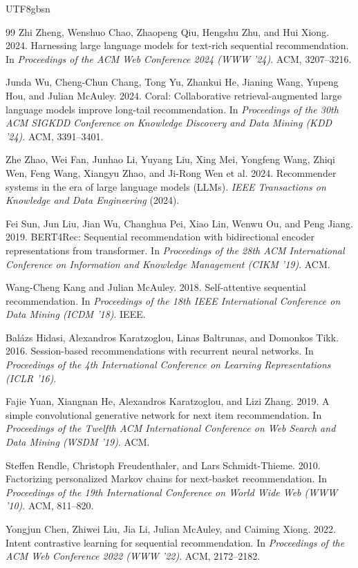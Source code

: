 \documentclass{article}
\begin{document}
\begin{CJK*}{UTF8}{gbsn}
\begin{thebibliography}{99}
Zhi Zheng, Wenshuo Chao, Zhaopeng Qiu, Hengshu Zhu, and Hui Xiong. 2024.
Harnessing large language models for text-rich sequential recommendation.
In \textit{Proceedings of the ACM Web Conference 2024 (WWW '24)}. ACM, 3207--3216.

Junda Wu, Cheng-Chun Chang, Tong Yu, Zhankui He, Jianing Wang, Yupeng Hou, and Julian McAuley. 2024.
Coral: Collaborative retrieval-augmented large language models improve long-tail recommendation.
In \textit{Proceedings of the 30th ACM SIGKDD Conference on Knowledge Discovery and Data Mining (KDD '24)}. ACM, 3391--3401.

Zhe Zhao, Wei Fan, Junhao Li, Yuyang Liu, Xing Mei, Yongfeng Wang, Zhiqi Wen, Feng Wang, Xiangyu Zhao, and Ji-Rong Wen et al. 2024.
Recommender systems in the era of large language models (LLMs).
\textit{IEEE Transactions on Knowledge and Data Engineering} (2024).

Fei Sun, Jun Liu, Jian Wu, Changhua Pei, Xiao Lin, Wenwu Ou, and Peng Jiang. 2019.
BERT4Rec: Sequential recommendation with bidirectional encoder representations from transformer.
In \textit{Proceedings of the 28th ACM International Conference on Information and Knowledge Management (CIKM '19)}. ACM.

Wang-Cheng Kang and Julian McAuley. 2018.
Self-attentive sequential recommendation.
In \textit{Proceedings of the 18th IEEE International Conference on Data Mining (ICDM '18)}. IEEE.

Bal\'azs Hidasi, Alexandros Karatzoglou, Linas Baltrunas, and Domonkos Tikk. 2016.
Session-based recommendations with recurrent neural networks.
In \textit{Proceedings of the 4th International Conference on Learning Representations (ICLR '16)}.

Fajie Yuan, Xiangnan He, Alexandros Karatzoglou, and Lizi Zhang. 2019.
A simple convolutional generative network for next item recommendation.
In \textit{Proceedings of the Twelfth ACM International Conference on Web Search and Data Mining (WSDM '19)}. ACM.

Steffen Rendle, Christoph Freudenthaler, and Lars Schmidt-Thieme. 2010.
Factorizing personalized Markov chains for next-basket recommendation.
In \textit{Proceedings of the 19th International Conference on World Wide Web (WWW '10)}. ACM, 811--820.

Yongjun Chen, Zhiwei Liu, Jia Li, Julian McAuley, and Caiming Xiong. 2022.
Intent contrastive learning for sequential recommendation.
In \textit{Proceedings of the ACM Web Conference 2022 (WWW '22)}. ACM, 2172--2182.


\end{thebibliography}
\end{CJK*}
\end{document}
